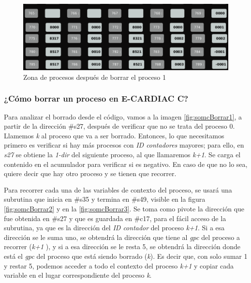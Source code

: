 \documentclass[letterpaper,12pt,oneside]{book}
\begin{document}
		\begin{figure}[h]		
			\centering
			\includegraphics[scale=0.45]{media/CARDIACC/ZPAfterProceso1Borrado.png}
			\caption{ Zona de procesos después de borrar el proceso 1}
			\label{fig:ZPAfterProceso1Borrado}
		\end{figure}
		
		
		\subsubsection{¿Cómo borrar un proceso en E-CARDIAC C?}
		
		
		Para analizar el borrado desde el código,  vamos a la imagen \ref{fig:somcBorrar1}, a partir de la dirección \#s27, después
		de verificar que no se trata del proceso 0. Llamemos \textit{k} al proceso que va a ser borrado. Entonces, lo que necesitamos
		primero
		es verificar si hay más procesos con \textit{ID contadores} mayores; para ello, en \textit{s27}
		se obtiene la \textit{1-dir} del siguiente proceso, al que llamaremos \textit{k+1}.
		Se carga el contenido en el acumulador para
		verificar si es negativo. En caso de que no lo sea, quiere decir que hay otro proceso y se tienen que recorrer.
		
		Para recorrer cada una
		de las variables de contexto del proceso, se usará una subrutina que 
		inicia en \#s35 y termina en \#s49, visible en la figura \ref{fig:somcBorrar2} y en la \ref{fig:somcBorrar3}. 
		Se toma como pivote la dirección que 
		fue obtenida en \#s27 y que es guardada en
		\#c17, para el fácil acceso de la subrutina, ya que es la dirección
		del \textit{ID contador} del proceso \textit{k+1}. Si a esa dirección se le suma uno, se obtendrá la dirección que tiene al \textit{gpc}
		del proceso a recorrer (\textit{k+1 }), y si a esa dirección se le resta 5, 
		se obtendrá la dirección donde está  el \textit{gpc} del proceso que está siendo 
		borrado (\textit{k}). Es decir que, con solo sumar 1 y restar 5, podemos acceder a todo el contexto del proceso \textit{k+1} y copiar
		cada variable en el lugar correspondiente del proceso \textit{k}.
		
\end{document}
